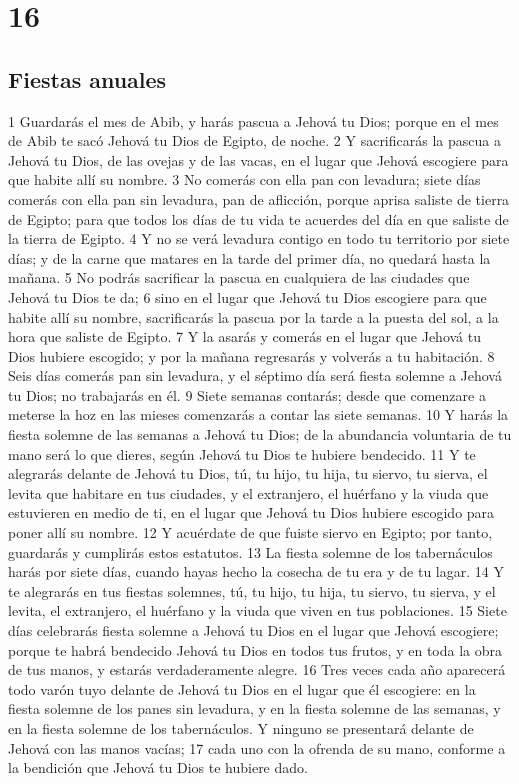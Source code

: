 \chapter{16}


\section{Fiestas anuales }


1 Guardarás el mes de Abib, y harás pascua  a Jehová tu Dios; porque en el mes de Abib te sacó Jehová tu Dios de Egipto, de noche.
2 Y sacrificarás la pascua a Jehová tu Dios, de las ovejas y de las vacas, en el lugar que Jehová escogiere para que habite allí su nombre.
3 No comerás con ella pan con levadura; siete días comerás con ella pan sin levadura, pan de aflicción, porque aprisa saliste de tierra de Egipto; para que todos los días de tu vida te acuerdes del día en que saliste de la tierra de Egipto.
4 Y no se verá levadura contigo en todo tu territorio por siete días; y de la carne que matares en la tarde del primer día, no quedará hasta la mañana.
5 No podrás sacrificar la pascua en cualquiera de las ciudades que Jehová tu Dios te da;
6 sino en el lugar que Jehová tu Dios escogiere para que habite allí su nombre, sacrificarás la pascua por la tarde a la puesta del sol, a la hora que saliste de Egipto.
7 Y la asarás y comerás en el lugar que Jehová tu Dios hubiere escogido; y por la mañana regresarás y volverás a tu habitación.
8 Seis días comerás pan sin levadura, y el séptimo día será fiesta solemne a Jehová tu Dios; no trabajarás en él.
9 Siete semanas contarás; desde que comenzare a meterse la hoz en las mieses comenzarás a contar las siete semanas.
10 Y harás la fiesta solemne de las semanas  a Jehová tu Dios; de la abundancia voluntaria de tu mano será lo que dieres, según Jehová tu Dios te hubiere bendecido.
11 Y te alegrarás delante de Jehová tu Dios, tú, tu hijo, tu hija, tu siervo, tu sierva, el levita que habitare en tus ciudades, y el extranjero, el huérfano y la viuda que estuvieren en medio de ti, en el lugar que Jehová tu Dios hubiere escogido para poner allí su nombre.
12 Y acuérdate de que fuiste siervo en Egipto; por tanto, guardarás y cumplirás estos estatutos.
13 La fiesta solemne de los tabernáculos harás por siete días, cuando hayas hecho la cosecha de tu era y de tu lagar.
14 Y te alegrarás en tus fiestas solemnes, tú, tu hijo, tu hija, tu siervo, tu sierva, y el levita, el extranjero, el huérfano y la viuda que viven en tus poblaciones.
15 Siete días celebrarás fiesta solemne a Jehová tu Dios en el lugar que Jehová escogiere; porque te habrá bendecido Jehová tu Dios en todos tus frutos, y en toda la obra de tus manos, y estarás verdaderamente alegre. 
16 Tres veces cada año aparecerá todo varón tuyo delante de Jehová tu Dios en el lugar que él escogiere: en la fiesta solemne de los panes sin levadura, y en la fiesta solemne de las semanas, y en la fiesta solemne de los tabernáculos. Y ninguno se presentará delante de Jehová con las manos vacías;
17 cada uno con la ofrenda de su mano, conforme a la bendición que Jehová tu Dios te hubiere dado.

